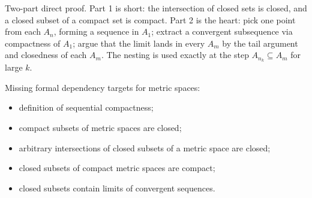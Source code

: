 \begin{remark*}
Two-part direct proof. Part 1 is short: the intersection of closed sets is closed,
and a closed subset of a compact set is compact. Part 2 is the heart: pick one
point from each $A_n$, forming a sequence in $A_1$; extract a convergent
subsequence via compactness of $A_1$; argue that the limit lands in every $A_m$
by the tail argument and closedness of each $A_m$. The nesting is used exactly
at the step $A_{n_k} \subseteq A_m$ for large $k$.
\end{remark*}

\begin{dependencies}
Missing formal dependency targets for metric spaces:
\begin{itemize}
  \item definition of sequential compactness;
  \item compact subsets of metric spaces are closed;
  \item arbitrary intersections of closed subsets of a metric space are closed;
  \item closed subsets of compact metric spaces are compact;
  \item closed subsets contain limits of convergent sequences.
\end{itemize}
\end{dependencies}






















